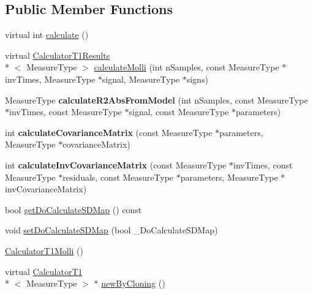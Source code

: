 \subsection*{Public Member Functions}
\begin{DoxyCompactItemize}
\item 
virtual int \hyperlink{class_ox_1_1_calculator_t1_molli_a6f15bc9c026305248c927d62748903bf}{calculate} ()
\item 
virtual \hyperlink{struct_ox_1_1_calculator_t1_results}{Calculator\-T1\-Results}\\*
$<$ Measure\-Type $>$ \hyperlink{class_ox_1_1_calculator_t1_molli_a9cb84f5e8680e1bf6c3543846fc90c4d}{calculate\-Molli} (int n\-Samples, const Measure\-Type $\ast$inv\-Times, Measure\-Type $\ast$signal, Measure\-Type $\ast$signs)
\item 
\hypertarget{class_ox_1_1_calculator_t1_molli_a9c9238dd8a96e06d3e0a96810377b90b}{Measure\-Type {\bfseries calculate\-R2\-Abs\-From\-Model} (int n\-Samples, const Measure\-Type $\ast$inv\-Times, const Measure\-Type $\ast$signal, const Measure\-Type $\ast$parameters)}\label{class_ox_1_1_calculator_t1_molli_a9c9238dd8a96e06d3e0a96810377b90b}

\item 
\hypertarget{class_ox_1_1_calculator_t1_molli_a030582bca754a7b81febfae53fe0c10c}{int {\bfseries calculate\-Covariance\-Matrix} (const Measure\-Type $\ast$parameters, Measure\-Type $\ast$covariance\-Matrix)}\label{class_ox_1_1_calculator_t1_molli_a030582bca754a7b81febfae53fe0c10c}

\item 
\hypertarget{class_ox_1_1_calculator_t1_molli_aec374fc512aa3b109138f0c16c53a171}{int {\bfseries calculate\-Inv\-Covariance\-Matrix} (const Measure\-Type $\ast$inv\-Times, const Measure\-Type $\ast$residuals, const Measure\-Type $\ast$parameters, Measure\-Type $\ast$inv\-Covariance\-Matrix)}\label{class_ox_1_1_calculator_t1_molli_aec374fc512aa3b109138f0c16c53a171}

\item 
bool \hyperlink{class_ox_1_1_calculator_t1_molli_a06d8579492ee063b129b489e638333be}{get\-Do\-Calculate\-S\-D\-Map} () const 
\item 
void \hyperlink{class_ox_1_1_calculator_t1_molli_a65a51dcadaafdefc576201de535f8810}{set\-Do\-Calculate\-S\-D\-Map} (bool \-\_\-\-Do\-Calculate\-S\-D\-Map)
\item 
\hyperlink{class_ox_1_1_calculator_t1_molli_ab1892de078822ea106fcaebcf81047be}{Calculator\-T1\-Molli} ()
\item 
virtual \hyperlink{class_ox_1_1_calculator_t1}{Calculator\-T1}\\*
$<$ Measure\-Type $>$ $\ast$ \hyperlink{class_ox_1_1_calculator_t1_molli_ae0fde362fbe16c4c40dee96330b4a676}{new\-By\-Cloning} ()
\end{DoxyCompactItemize}
